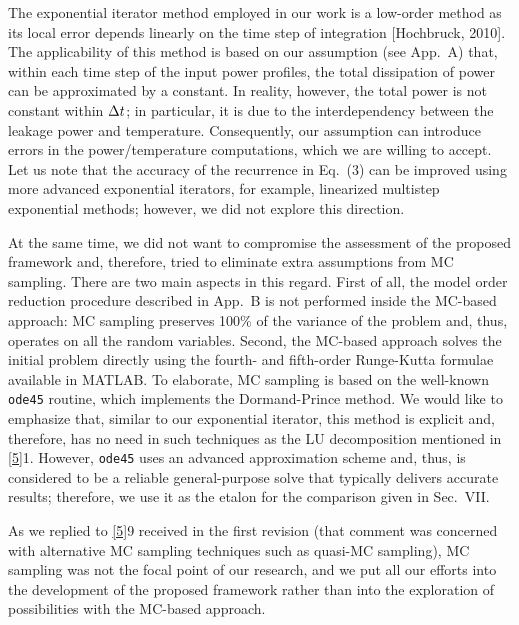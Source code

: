\begin{authors}
The exponential iterator method employed in our work is a low-order method as its local error depends linearly on the time step of integration [Hochbruck, 2010].
The applicability of this method is based on our assumption (see App.~A) that, within each time step of the input power profiles, the total dissipation of power can be approximated by a constant.
In reality, however, the total power is not constant within $\Delta t$; in particular, it is due to the interdependency between the leakage power and temperature.
Consequently, our assumption can introduce errors in the power/temperature computations, which we are willing to accept.
Let us note that the accuracy of the recurrence in Eq.~(3) can be improved using more advanced exponential iterators, for example, linearized multistep exponential methods; however, we did not explore this direction.

At the same time, we did not want to compromise the assessment of the proposed framework and, therefore, tried to eliminate extra assumptions from MC sampling.
There are two main aspects in this regard.
First of all, the model order reduction procedure described in App.~B is not performed inside the MC-based approach: MC sampling preserves 100\% of the variance of the problem and, thus, operates on all the random variables.
Second, the MC-based approach solves the initial problem directly using the fourth- and fifth-order Runge-Kutta formulae available in MATLAB.
To elaborate, MC sampling is based on the well-known \texttt{ode45} routine, which implements the Dormand-Prince method.
We would like to emphasize that, similar to our exponential iterator, this method is explicit and, therefore, has no need in such techniques as the LU decomposition mentioned in \cref{5}{1}.
However, \texttt{ode45} uses an advanced approximation scheme and, thus, is considered to be a reliable general-purpose solve that typically delivers accurate results; therefore, we use it as the etalon for the comparison given in Sec.~VII.

As we replied to \cref{5}{9} received in the first revision (that comment was concerned with alternative MC sampling techniques such as quasi-MC sampling), MC sampling was not the focal point of our research, and we put all our efforts into the development of the proposed framework rather than into the exploration of possibilities with the MC-based approach.

\begin{actions}
\end{actions}
\end{authors}


